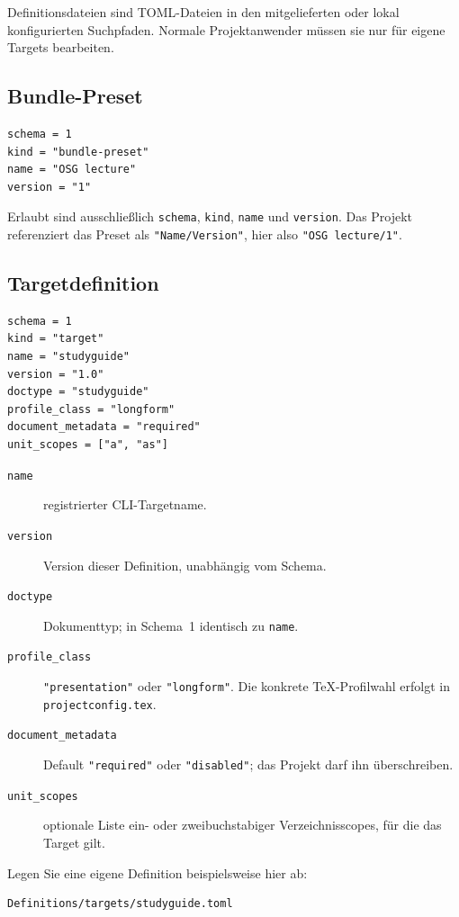 \documentclass[
load-preamble+
]{osgdoc}
\begin{document}
Definitionsdateien sind TOML-Dateien in den mitgelieferten oder lokal
konfigurierten Suchpfaden. Normale Projektanwender müssen sie nur für eigene
Targets bearbeiten.

\subsection{Bundle-Preset}

\begin{verbatim}
schema = 1
kind = "bundle-preset"
name = "OSG lecture"
version = "1"
\end{verbatim}

Erlaubt sind ausschließlich \verb|schema|, \verb|kind|, \verb|name| und
\verb|version|. Das Projekt referenziert das Preset als
\verb|"Name/Version"|, hier also \verb|"OSG lecture/1"|.

\subsection{Targetdefinition}

\begin{verbatim}
schema = 1
kind = "target"
name = "studyguide"
version = "1.0"
doctype = "studyguide"
profile_class = "longform"
document_metadata = "required"
unit_scopes = ["a", "as"]
\end{verbatim}

\begin{description}
\item[\texttt{name}] registrierter CLI-Targetname.
\item[\texttt{version}] Version dieser Definition, unabhängig vom Schema.
\item[\texttt{doctype}] Dokumenttyp; in Schema~1 identisch zu \texttt{name}.
\item[\texttt{profile\_class}] \verb|"presentation"| oder
  \verb|"longform"|. Die konkrete TeX-Profilwahl erfolgt in
  \texttt{projectconfig.tex}.
\item[\texttt{document\_metadata}] Default \verb|"required"| oder
  \verb|"disabled"|; das Projekt darf ihn überschreiben.
\item[\texttt{unit\_scopes}] optionale Liste ein- oder zweibuchstabiger
  Verzeichnisscopes, für die das Target gilt.
\end{description}

Legen Sie eine eigene Definition beispielsweise hier ab:

\begin{verbatim}
Definitions/targets/studyguide.toml
\end{verbatim}
\end{document}
